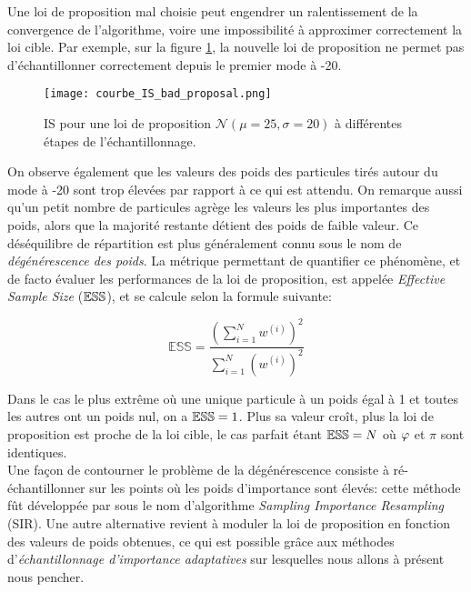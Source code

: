 Une loi de proposition mal choisie peut engendrer un ralentissement de la convergence de l'algorithme, voire une impossibilité à approximer correctement la loi cible. Par exemple, sur la figure \ref{courbe_IS_bad_proposal}, la nouvelle loi de proposition ne permet pas d'échantillonner correctement depuis le premier mode à -20.

\begin{figure}[h!]
	\centering
	\texttt{[image: courbe\_IS\_bad\_proposal.png]}
	\caption{IS pour une loi de proposition $\mathcal{N}(\mu=25, \sigma=20)$ à différentes étapes de l'échantillonnage.}
	\label{courbe_IS_bad_proposal}
\end{figure}

On observe également que les valeurs des poids des particules tirés autour du mode à -20 sont trop élevées par rapport à ce qui est attendu. On remarque aussi qu'un petit nombre de particules agrège les valeurs les plus importantes des poids, alors que la majorité restante détient des poids de faible valeur. Ce déséquilibre de répartition est plus généralement connu sous le nom de \textit{dégénérescence des poids}. La métrique permettant de quantifier ce phénomène, et de facto évaluer les performances de la loi de proposition, est appelée \textit{Effective Sample Size} (${\mathbb{ESS}}$), et se calcule selon la formule suivante:

\begin{equation}
\mathbb{ESS} = \dfrac{\left(\sum\limits_{i=1}^N w^{(i)}\right)^2}{\sum\limits_{i=1}^N \left(w^{(i)}\right)^2}
\label{eq_def_ESS}
\end{equation}

Dans le cas le plus extrême où une unique particule à un poids égal à 1 et toutes les autres ont un poids nul, on a ${\mathbb{ESS}} = 1$. Plus sa valeur croît, plus la loi de proposition est proche de la loi cible, le cas parfait étant ${\mathbb{ESS}} = N$ où ${\varphi}$ et $\pi$ sont identiques.\\

Une façon de contourner le problème de la dégénérescence consiste à ré-échantillonner sur les points où les poids d'importance sont élevés: cette méthode fût développée par \cite{Rubin1988} sous le nom d'algorithme \textit{Sampling Importance Resampling} (SIR). Une autre alternative revient à moduler la loi de proposition en fonction des valeurs de poids obtenues, ce qui est possible grâce aux méthodes d'\textit{échantillonnage d'importance adaptatives} sur lesquelles nous allons à présent nous pencher.\\

